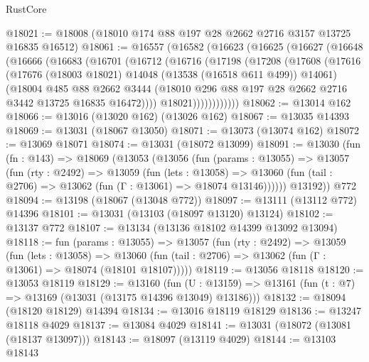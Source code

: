 \begin{lexlean}{RustCore}
\begin{coremodule}
@18021 := @18008 (@18010 @174 @88 @197 @28 @2662 @2716 @3157 @13725 @16835 @16512)
@18061 := @16557
    (@16582
      (@16623
        (@16625
          (@16627
            (@16648
              (@16666
                (@16683
                  (@16701
                    (@16712
                      (@16716
                        (@17198
                          (@17208
                            (@17608
                              (@17616
                                (@17676 (@18003 @18021) @14048 (@13538 (@16518 @611 @499)) @14061)
                                (@18004
                                  @485
                                  @88
                                  @2662
                                  @3444
                                  (@18010
                                    @296
                                    @88
                                    @197
                                    @28
                                    @2662
                                    @2716
                                    @3442
                                    @13725
                                    @16835
                                    @16472))))
                            @18021))))))))))))
@18062 := @13014 @162
@18066 := @13016 (@13020 @162) (@13026 @162)
@18067 := @13035 @14393
@18069 := @13031 (@18067 @13050)
@18071 := @13073 (@13074 @162)
@18072 := @13069 @18071
@18074 := @13031 (@18072 @13099)
@18091 := @13030
    (fun (fn : @143) =>
    @18069
      (@13053
        (@13056
          (fun (params : @13055) =>
          @13057
            (fun (rty : @2492) =>
            @13059
              (fun (lets : @13058) =>
              @13060 (fun (tail : @2706) => @13062 (fun (Γ : @13061) => @18074 @13146))))))
        @13192))
    @772
@18094 := @13198 (@18067 (@13048 @772))
@18097 := @13111 (@13112 @772) @14396
@18101 := @13031 (@13103 (@18097 @13120) @13124)
@18102 := @13137 @772
@18107 := @13134 (@13136 @18102 @14399 @13092 @13094)
@18118 := fun (params : @13055) =>
  @13057
    (fun (rty : @2492) =>
    @13059
      (fun (lets : @13058) =>
      @13060 (fun (tail : @2706) => @13062 (fun (Γ : @13061) => @18074 (@18101 @18107)))))
@18119 := @13056 @18118
@18120 := @13053 @18119
@18129 := @13160
    (fun (U : @13159) => @13161 (fun (t : @7) => @13169 (@13031 (@13175 @14396 @13049) @13186)))
@18132 := @18094 (@18120 @18129) @14394
@18134 := @13016 @18119 @18129
@18136 := @13247 @18118 @4029
@18137 := @13084 @4029
@18141 := @13031 (@18072 (@13081 (@18137 @13097)))
@18143 := @18097 (@13119 @4029)
@18144 := @13103 @18143

\end{coremodule}
\end{lexlean}
